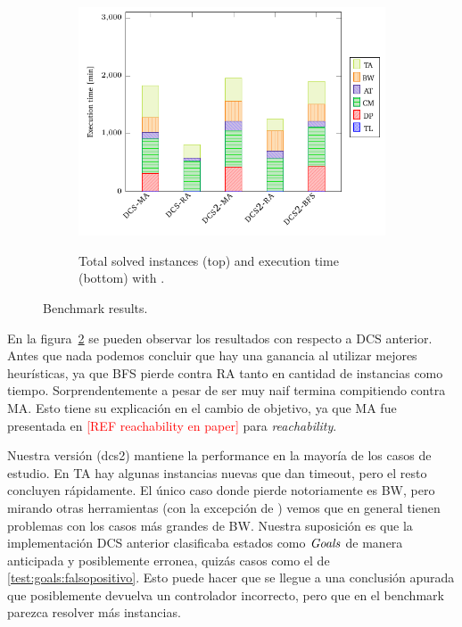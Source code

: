\begin{figure}[th]
\begin{subfigure}{0.5\textwidth}
        \includegraphics[width=\linewidth]{figures/benchmark/dcs_time.pdf}\label{fig:dcs:results:time}
        \caption{Total solved instances (top) and execution time (bottom) with \DCS.}
    \end{subfigure}
\caption{Benchmark results.}
\label{fig:dcs:results}
\end{figure}

En la figura~\ref{fig:dcs:results} se pueden observar los resultados con respecto a DCS anterior. Antes que nada podemos concluir que hay una ganancia al utilizar mejores heurísticas, ya que BFS pierde contra RA tanto en cantidad de instancias como tiempo. Sorprendentemente a pesar de ser muy naif termina compitiendo contra MA. Esto tiene su explicación en el cambio de objetivo, ya que MA fue presentada en \textcolor{red}{[REF reachability en paper]} para \textit{reachability}.

Nuestra versión (dcs2) mantiene la performance en la mayoría de los casos de estudio. En TA hay algunas instancias nuevas que dan timeout, pero el resto concluyen rápidamente. El único caso donde pierde notoriamente es BW, pero mirando otras herramientas (con la excepción de \MYND) vemos que en general tienen problemas con los casos más grandes de BW. Nuestra suposición es que la implementación DCS anterior clasificaba estados como $\mathit{Goals}$ de manera anticipada y posiblemente erronea, quizás casos como el de \ref{test:goals:falsopositivo}. Esto puede hacer que se llegue a una conclusión apurada que posiblemente devuelva un controlador incorrecto, pero que en el benchmark parezca resolver más instancias.

